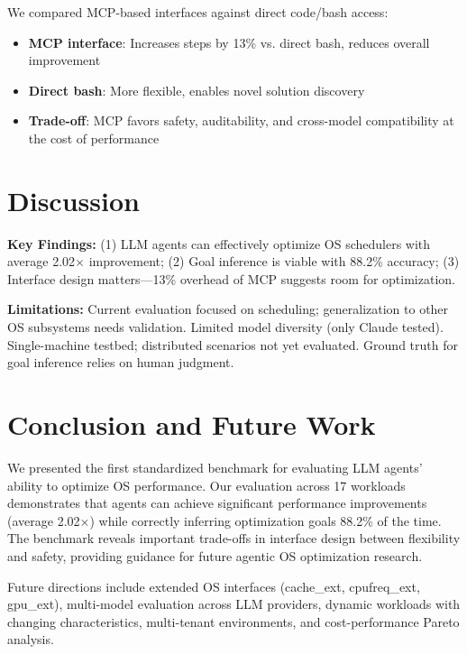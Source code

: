 \documentclass{article}
\begin{document}
We compared MCP-based interfaces against direct code/bash access:
\begin{itemize}[nosep]
    \item \textbf{MCP interface}: Increases steps by 13\% vs. direct bash, reduces overall improvement
    \item \textbf{Direct bash}: More flexible, enables novel solution discovery
    \item \textbf{Trade-off}: MCP favors safety, auditability, and cross-model compatibility at the cost of performance
\end{itemize}

\section{Discussion}

\textbf{Key Findings:} (1) LLM agents can effectively optimize OS schedulers with average 2.02$\times$ improvement; (2) Goal inference is viable with 88.2\% accuracy; (3) Interface design matters---13\% overhead of MCP suggests room for optimization.

\textbf{Limitations:} Current evaluation focused on scheduling; generalization to other OS subsystems needs validation. Limited model diversity (only Claude tested). Single-machine testbed; distributed scenarios not yet evaluated. Ground truth for goal inference relies on human judgment.

\section{Conclusion and Future Work}

We presented the first standardized benchmark for evaluating LLM agents' ability to optimize OS performance. Our evaluation across 17 workloads demonstrates that agents can achieve significant performance improvements (average 2.02$\times$) while correctly inferring optimization goals 88.2\% of the time. The benchmark reveals important trade-offs in interface design between flexibility and safety, providing guidance for future agentic OS optimization research.

Future directions include extended OS interfaces (cache\_ext, cpufreq\_ext, gpu\_ext), multi-model evaluation across LLM providers, dynamic workloads with changing characteristics, multi-tenant environments, and cost-performance Pareto analysis.



\end{document}
